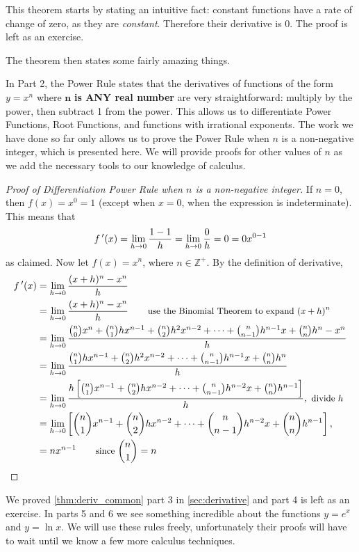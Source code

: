 This theorem starts by stating an intuitive fact: constant functions have a rate of change of zero, as they are \emph{constant}. Therefore their derivative is 0. The proof is left as an exercise.

The theorem then states some fairly amazing things.

In Part 2, the Power Rule states that the derivatives of functions of the form $y=x^n$ where $\mathbf{n}$ \textbf{is ANY real number} are very straightforward: multiply by the power, then subtract 1 from the power. This allows us to differentiate Power Functions, Root Functions, and functions with irrational exponents. The work we have done so far only allows us to prove the Power Rule when $n$ is a non-negative integer, which is presented here. We will provide proofs for other values of $n$ as we add the necessary tools to our knowledge of calculus.

\begin{proof}[Proof of Differentiation Power Rule when $n$ is a non-negative integer]
If $n=0$, then $f(x)=x^0=1$ (except when $x=0$, when the expression is indeterminate).  This means that
\[f\,'(x)=\lim_{h\to0}\frac{1-1}h=\lim_{h\to0}\frac0h=0=0x^{0-1}\]
as claimed.  Now let $f(x)= x^n$, where $n \in \mathbb{Z}^+$. By the definition of derivative,
\begin{align*}
f\,'(x)
&= \lim_{h\to 0} \dfrac{(x+h)^n - x^n}{h} \\
&= \lim_{h\to 0} \dfrac{(x+h)^n - x^n}{h} \qquad\text{\small use the Binomial Theorem to expand $(x+h)^n$} \\
&=\lim_{h\to 0} \dfrac{\binom{n}{0}x^n + \binom{n}{1} hx^{n-1} + \binom{n}{2} h^2x^{n-2}+ \dotsb +\binom{n}{n-1} h^{n-1}x + \binom {n}{n} h^n  -x^n}{h} \\
&= \lim_{h\to 0} \dfrac{\binom{n}{1} hx^{n-1} + \binom{n}{2} h^2x^{n-2}+ \dotsb +\binom{n}{n-1} h^{n-1}x + \binom{n}{n} h^n}{h} \\
&= \lim_{h\to 0} \dfrac{h\left[\binom{n}{1} x^{n-1} + \binom{n}{2} h x^{n-2}+ \dotsb +\binom{n}{n-1} h^{n-2}x + \binom {n}{n} h^{n-1}\right]}{h},\text{\small~divide $h$}\\
&= \lim_{h\to 0}\left[\dbinom{n}{1} x^{n-1} + \dbinom{n}{2} h x^{n-2}+ \dotsb +\dbinom{n}{n-1} h^{n-2}x + \dbinom {n}{n} h^{n-1}\right],\\
&=  n x^{n-1} \qquad\text{\small since } \dbinom{n}{1} = n \qedhere
\end{align*}
\end{proof}

We proved \autoref{thm:deriv_common} part 3 in \autoref{sec:derivative} and part 4 is left as an exercise.  In parts 5 and 6 we see something incredible about the functions $y=e^x$ and $y=\ln x$. We will use these rules freely, unfortunately their proofs will have to wait until we know a few more calculus techniques.

